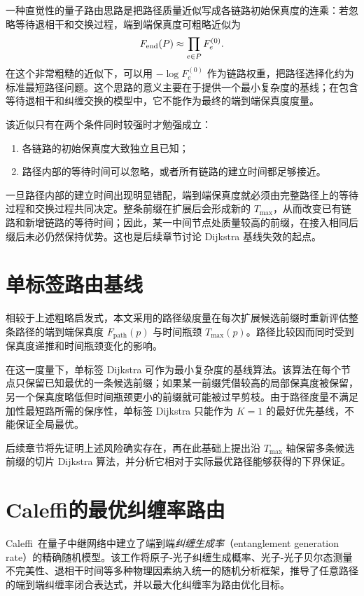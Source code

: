 一种直觉性的量子路由思路是把路径质量近似写成各链路初始保真度的连乘：若忽略等待退相干和交换过程，端到端保真度可粗略近似为
\[
F_{\rm end}(P) \approx \prod_{e \in P} F^{(0)}_e .
\]
在这个非常粗糙的近似下，可以用 $-\log F^{(0)}_e$ 作为链路权重，把路径选择化约为标准最短路径问题。这个思路的意义主要在于提供一个最小复杂度的基线；在包含等待退相干和纠缠交换的模型中，它不能作为最终的端到端保真度度量。

该近似只有在两个条件同时较强时才勉强成立：

\begin{enumerate}
  \item 各链路的初始保真度大致独立且已知；
  \item 路径内部的等待时间可以忽略，或者所有链路的建立时间都足够接近。
\end{enumerate}

一旦路径内部的建立时间出现明显错配，端到端保真度就必须由完整路径上的等待过程和交换过程共同决定。整条前缀在扩展后会形成新的 $T_{\max}$，从而改变已有链路和新增链路的等待时间；因此，某一中间节点处质量较高的前缀，在接入相同后缀后未必仍然保持优势。这也是后续章节讨论 Dijkstra 基线失效的起点。

\section{单标签路由基线}
\label{sec:current-routing-baseline}

相较于上述粗略启发式，本文采用的路径级度量在每次扩展候选前缀时重新评估整条路径的端到端保真度 $F_{\mathrm{path}}(p)$ 与时间瓶颈 $T_{\max}(p)$。路径比较因而同时受到保真度递推和时间瓶颈变化的影响。

在这一度量下，单标签 Dijkstra 可作为最小复杂度的基线算法。该算法在每个节点只保留已知最优的一条候选前缀；如果某一前缀凭借较高的局部保真度被保留，另一个保真度略低但时间瓶颈更小的前缀就可能被过早剪枝。由于路径度量不满足加性最短路所需的保序性，单标签 Dijkstra 只能作为 $K=1$ 的最好优先基线，不能保证全局最优。

后续章节将先证明上述风险确实存在，再在此基础上提出沿 $T_{\max}$ 轴保留多条候选前缀的切片 Dijkstra 算法，并分析它相对于实际最优路径能够获得的下界保证。

\section{Caleffi的最优纠缠率路由}
\label{sec:caleffi-routing}

Caleffi~\cite{Caleffi2017Routing}在量子中继网络中建立了端到端\emph{纠缠生成率}（entanglement generation rate）的精确随机模型。该工作将原子-光子纠缠生成概率、光子-光子贝尔态测量不完美性、退相干时间等多种物理因素纳入统一的随机分析框架，推导了任意路径的端到端纠缠率闭合表达式，并以最大化纠缠率为路由优化目标。

